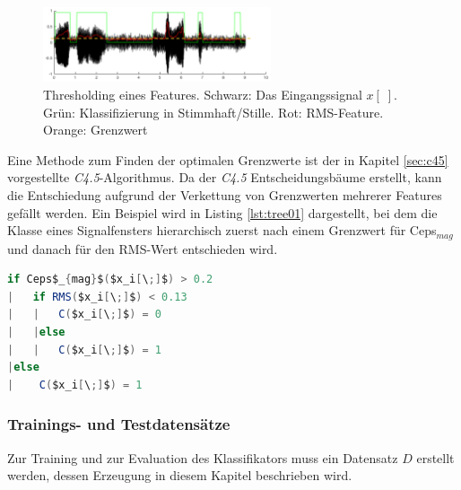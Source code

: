 \begin{figure}[h]
	\centering
	\includegraphics[width=0.6\textwidth]{bilder/thresholded02.png}
	\caption{Thresholding eines Features. Schwarz: Das Eingangssignal $x[\;]$. Grün: Klassifizierung in Stimmhaft/Stille. Rot: RMS-Feature. Orange: Grenzwert}
	\label{img:thresholded}
\end{figure}

Eine Methode zum Finden der optimalen Grenzwerte ist der in Kapitel \ref{sec:c45} vorgestellte \emph{C4.5}-Algorithmus. Da der \emph{C4.5} Entscheidungsbäume erstellt, kann die Entschiedung aufgrund der Verkettung von Grenzwerten mehrerer Features gefällt werden. Ein Beispiel wird in Listing \ref{lst:tree01} dargestellt, bei dem die Klasse eines  Signalfensters hierarchisch zuerst nach einem Grenzwert für Ceps$_{mag}$ und danach für den RMS-Wert entschieden wird.

\begin{lstlisting}[frame=single,mathescape=true,basicstyle=\footnotesize,language=Java,label=lst:tree01,caption=Beispiel eines CART-Entscheidungsbaums,linewidth=1\textwidth]
if Ceps$_{mag}$($x_i[\;]$) > 0.2
|   if RMS($x_i[\;]$) < 0.13
|   |   C($x_i[\;]$) = 0
|   |else
|   |   C($x_i[\;]$) = 1
|else
|    C($x_i[\;]$) = 1
\end{lstlisting}

\subsubsection{Trainings- und Testdatensätze}
\label{sec:databases}

Zur Training und zur Evaluation des Klassifikators muss ein Datensatz $D$ erstellt werden, dessen Erzeugung in diesem Kapitel beschrieben wird. 

